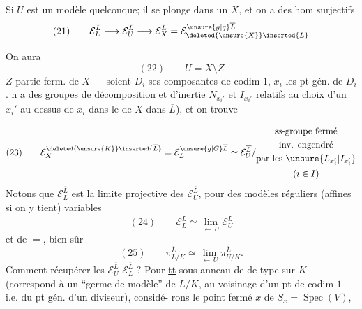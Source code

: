 
Si $U$ est un modèle quelconque; il se plonge dans un $X$, et on a des hom surjectifs
\[
(21)\qquad \mathcal E_L^{\overline L}\longrightarrow\mathcal E_U^{\overline L}\longrightarrow\mathcal E_X^{\overline L}=\mathcal E_{\deleted{\unsure{X}}\inserted{L}}^{\unsure{g|q}\overline L}
\]

On aura 
\[
(22)\qquad U=X\setminus Z
\]
$Z$ partie ferm. de $X$ --- soient $D_i$ ses composantes de codim $1$, $x_i$ les pt gén. de $D_i$. n a des groupes de décomposition et d'inertie $N_{x_i'}$ et $I_{x_i'}$   relatifs au choix d'un $x_i'$ au dessus de $x_i$ dans le  de $X$ dans $\overline L$), et on trouve


\[
(23)\qquad
\mathcal E_X^{\deleted{\unsure{K}}\inserted{\overline L}}
=\mathcal E_L^{\unsure{g|G}\overline L}
\simeq\mathcal E_U^{\overline L}/\begin{gathered}\text{ss-groupe fermé}\\\text{inv. engendré}\\\text{par les }\unsure{L_{x_i'}|I_{x_i'}}\\(i\in I)\end{gathered}
\]
Notons que $\mathcal E_L^{\overline L}$ est la limite projective des $\mathcal E_U^{\overline L}$, pour des modèles réguliers (affines si on y tient) variables
\[
(24)\qquad\mathcal E_L^{\overline L}\simeq\lim_{\longleftarrow\,U}\mathcal E_U^{\overline L}
\]
et de $=$, bien sûr
\[
(25)\qquad\pi_{L/K}^{\overline L}\simeq\lim_{\longleftarrow\,U}\pi_{U/K}^{\overline L}.
\]
Comment récupérer les $\mathcal E_U^{\overline L}$  $\mathcal E_L^{\overline L}$ ? Pour \uline{tt} sous-anneau  de  de type  sur $K$ (correspond à un ``germe de modèle'' de $L/K$, au voisinage d'un pt de codim $1$ i.e. du pt gén. d'un diviseur), considé-\newline
rons le point fermé $x$ de $S_x=\operatorname{Spec}(V)$,
\margin{Dans les considérations qui suivent, $K$ (et $X,U$) ne jouent provisoirement aucun rôle --- \unsure{(|[}Mais on pourrait ``plus gén.'' regarder groupes de décomp. \deleted{\unsure{de dimension relative}} d'un des ``$U$'' \uline{mais seulement} \uline{\unsure{épis-comp|épais-comp}} (la ``généralisation'' étant triviale, \unsure{par} $\mathcal E_L\longrightarrow\mathcal E_U$)}

